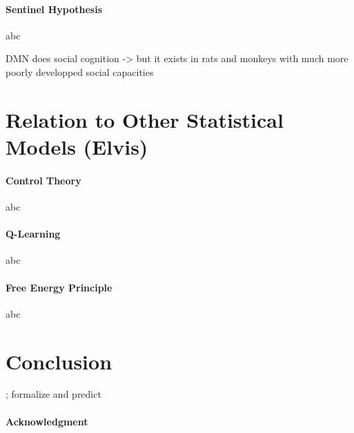 \documentclass{article} %
\begin{document}
\paragraph{Sentinel Hypothesis}
abc

DMN does social cognition -> but it exists in rats and monkeys with much more poorly developped social capacities


\section{Relation to Other Statistical Models (Elvis)}
\paragraph{Control Theory}
abc

\paragraph{Q-Learning}
abc

\paragraph{Free Energy Principle}
abc



\section{Conclusion}

; formalize and predict




\paragraph{Acknowledgment}

\small


\end{document}
